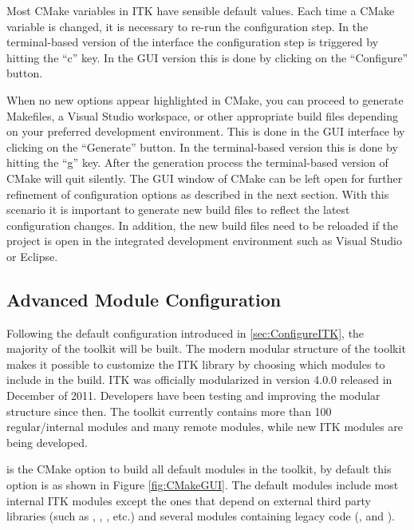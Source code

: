 Most CMake variables in ITK have sensible default values. Each time a CMake
variable is changed, it is necessary to re-run the configuration step. In the
terminal-based version of the interface the configuration step is triggered by
hitting the ``c'' key. In the GUI version this is done by clicking on the
``Configure'' button.

When no new options appear highlighted in CMake, you can proceed to generate
Makefiles, a Visual Studio workspace, or other appropriate build files depending
on your preferred development environment. This is done in the GUI interface by
clicking on the ``Generate'' button. In the terminal-based version this is done
by hitting the ``g'' key. After the generation process the terminal-based
version of CMake will quit silently. The GUI window of CMake can be left open
for further refinement of configuration options as described in the next
section. With this scenario it is important to generate new build files to
reflect the latest configuration changes. In addition, the new build files need
to be reloaded if the project is open in the integrated development environment
such as Visual Studio or Eclipse.

\subsection{Advanced Module Configuration}
\label{sec:ModuleConfiguration}


Following the default configuration introduced in \ref{sec:ConfigureITK},
the majority of the toolkit will be built. The modern modular structure of the
toolkit makes it possible to customize the ITK library by choosing which modules
to include in the build. ITK was officially modularized in version 4.0.0
released in December of 2011. Developers have been testing and improving the
modular structure since then. The toolkit currently contains more than 100
regular/internal modules and many remote modules, while new ITK modules are
being developed.

 is the CMake option to build all default
modules in the toolkit, by default this option is  as shown in Figure
\ref{fig:CMakeGUI}. The default modules include most internal ITK modules except
the ones that depend on external third party libraries (such as
, , , etc.)
and several modules containing legacy code (,
 and ).

